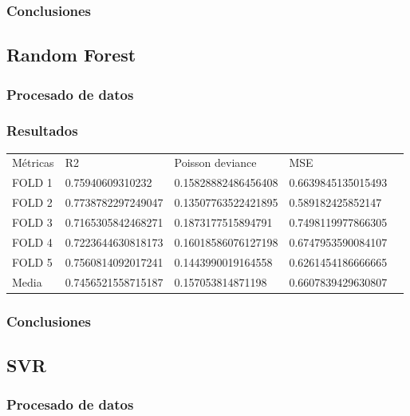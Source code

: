 \subsubsection{Conclusiones}

\subsection{Random Forest}
\subsubsection{Procesado de datos}
\subsubsection{Resultados}
\begin{table}[htbp]
    \begin{tabular}{|l|l|l|l|l}
    \cline{1-4}
    Métricas & R2                 & Poisson deviance    & MSE                \\ \cline{1-4}
    FOLD 1   & 0.75940609310232   & 0.15828882486456408 & 0.6639845135015493 \\ \cline{1-4}
    FOLD 2   & 0.7738782297249047 & 0.13507763522421895 & 0.589182425852147  \\ \cline{1-4}
    FOLD 3   & 0.7165305842468271 & 0.1873177515894791  & 0.7498119977866305 \\ \cline{1-4}
    FOLD 4   & 0.7223644630818173 & 0.16018586076127198 & 0.6747953590084107 \\ \cline{1-4}
    FOLD 5   & 0.7560814092017241 & 0.1443990019164558  & 0.6261454186666665 \\ \cline{1-4}
    Media    & 0.7456521558715187 & 0.157053814871198   & 0.6607839429630807 \\ \cline{1-4}
    \end{tabular}
\end{table}
\subsubsection{Conclusiones}
\pagebreak

\subsection{SVR}
\subsubsection{Procesado de datos}
